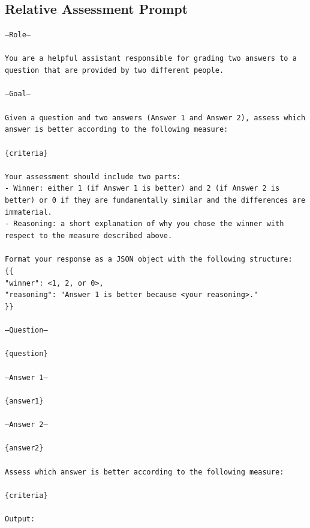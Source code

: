 \subsection{Relative Assessment Prompt}

\texttt{---Role---\\
\\
You are a helpful assistant responsible for grading two answers to a question that are provided by two different people.\\
\\
---Goal---\\
\\
Given a question and two answers (Answer 1 and Answer 2), assess which answer is better according to the following measure:\\
\\
\{criteria\}\\
\\
Your assessment should include two parts:\\
- Winner: either 1 (if Answer 1 is better) and 2 (if Answer 2 is better) or 0 if they are fundamentally similar and the differences are immaterial.\\
- Reasoning: a short explanation of why you chose the winner with respect to the measure described above.\\
\\
Format your response as a JSON object with the following structure:\\
\{\{\\
    "winner": <1, 2, or 0>,\\
    "reasoning": "Answer 1 is better because <your reasoning>."\\
\}\}\\
\\
---Question---\\
\\
\{question\}\\
\\
---Answer 1---\\
\\
\{answer1\}\\
\\
---Answer 2---\\
\\
\{answer2\}\\
\\
Assess which answer is better according to the following measure:\\
\\
\{criteria\}\\
\\
Output:}

